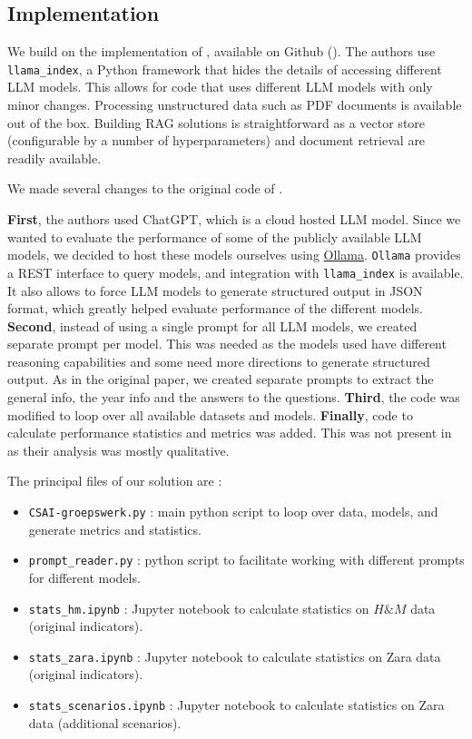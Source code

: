 \documentclass[]{article}
\begin{document}
\subsection{Implementation}

We build on the implementation of \cite{durability}, available on Github (\cite{github-orig}).
The authors use \texttt{llama\_index}, a Python framework that hides the details of accessing different LLM models.
This allows for code that uses different LLM models with only minor changes.
Processing unstructured data such as PDF documents is available out of the box.
Building RAG solutions is straightforward as a vector store (configurable by a number of hyperparameters) and document retrieval are readily available.

We made several changes to the original code of \cite{durability}.

\textbf{First}, the authors used ChatGPT, which is a cloud hosted LLM model.
Since we wanted to evaluate the performance of some of the publicly available LLM models, we decided to host these models ourselves using \href{https://ollama.com/}{Ollama}.
\texttt{Ollama} provides a REST interface to query models, and integration with \texttt{llama\_index} is available.
It also allows to force LLM models to generate structured output in JSON format, which greatly helped evaluate performance of the different models.
\textbf{Second}, instead of using a single prompt for all LLM models, we created separate prompt per model.
This was needed as the models used have different reasoning capabilities and some need more directions to generate structured output.
As in the original paper, we created separate prompts to extract the general info, the year info and the answers to the questions.
\textbf{Third}, the code was modified to loop over all available datasets and models.
\textbf{Finally}, code to calculate performance statistics and metrics was added.
This was not present in \cite{durability} as their analysis was mostly qualitative.

The principal files of our solution are :

\begin{itemize}
    \item \texttt{CSAI-groepswerk.py} : main python script to loop over data, models, and generate metrics and statistics.
    \item \texttt{prompt\_reader.py} : python script to facilitate working with different prompts for different models.
    \item \texttt{stats\_hm.ipynb} : Jupyter notebook to calculate statistics on $H\&M$ data (original indicators).
    \item \texttt{stats\_zara.ipynb} : Jupyter notebook to calculate statistics on Zara data (original indicators).
    \item \texttt{stats\_scenarios.ipynb} : Jupyter notebook to calculate statistics on Zara data (additional scenarios).
\end{itemize}
\end{document}
